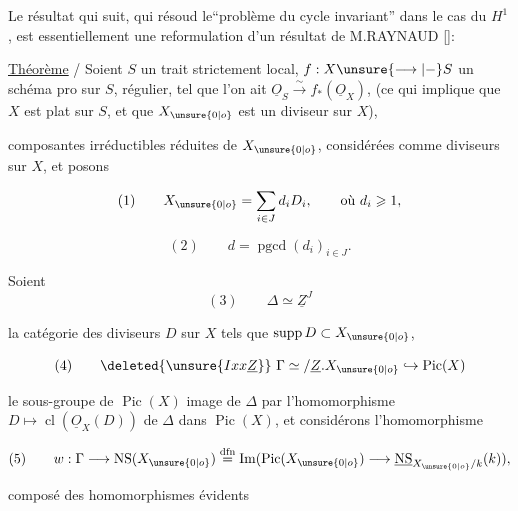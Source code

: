 
Le résultat qui suit, qui résoud le``problème du cycle invariant'' dans le cas du $H^1$, est essentiellement une reformulation d'un résultat de M.RAYNAUD [\quad]:
\margin{$\times$}

\uline{Théorème} / Soient $S$ un trait strictement local, $f:X\unsure{\longrightarrow|\mathbin{-}} S$ un schéma pro sur $S$, régulier, tel que l'on ait $\underline{O}_S\xrightarrow{\sim}f_*(\underline{O}_X)$, (ce qui implique que $X$ est plat sur $S$, et que $X_{\unsure{0|o}}$ est un diviseur sur $X$),  composantes irréductibles réduites de $X_{\unsure{0|o}}$, considérées comme diviseurs sur $X$, et posons 

\[
(1)\qquad X_{\unsure{0|o}}=\sum_{i\in J}d_iD_i,\qquad\text{où }d_i\geqslant1,
\]

\[
(2)\qquad d=\operatorname{pgcd}(d_i)_{i\in J}.
\]

Soient
\[
(3)\qquad\Delta\simeq\underline{Z}^{J}
\]

la catégorie des diviseurs $D$ sur $X$ tels que $\operatorname{supp}D\subset X_{\unsure{0|o}}$, 

\[
(4)\qquad\deleted{\unsure{Ixx\underline Z}}\ \Gamma\simeq/\underline Z.X_{\unsure{0|o}}\hookrightarrow\operatorname{Pic}(X)
\]

le  sous-groupe de $\operatorname{Pic}(X)$ image de $\Delta$ par l'homomorphisme $D\mapsto\operatorname{cl}(\underline{O}_X(D))$ de $\Delta$ dans $\operatorname{Pic}(X)$, et considérons l'homomorphisme 

\[
(5)\qquad w:\Gamma\longrightarrow\operatorname{NS}(X_{\unsure{0|o}})\overset{\mathrm{dfn}}{=}\operatorname{Im}(\operatorname{Pic}(X_{\unsure{0|o}})\longrightarrow\underline{\operatorname{NS}}_{X_{\unsure{0|o}}/k}(k)),
\]

composé des homomorphismes évidents

